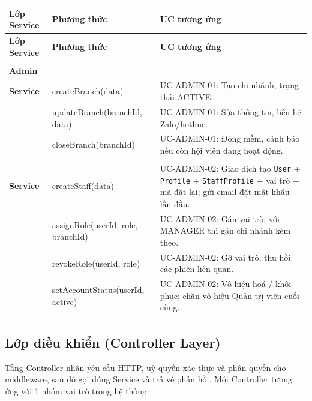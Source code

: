 \begingroup
\renewcommand{\arraystretch}{1.3}
\begin{longtable}{|>{\centering\arraybackslash}m{2.8cm}|>{\sloppy\small\ttfamily\raggedright\arraybackslash}p{7cm}|>{\raggedright\arraybackslash}m{4.5cm}|}
\hline
\textbf{Lớp Service} & \normalfont\normalsize\textbf{Phương thức} & \textbf{UC tương ứng} \\ \hline
\endfirsthead
\hline
\textbf{Lớp Service} & \normalfont\normalsize\textbf{Phương thức} & \textbf{UC tương ứng} \\ \hline
\endhead
\hline
\endfoot

\multirow{3}{*}{\makecell{\textbf{Branch}\\\textbf{Admin}\\\textbf{Service}}} &
  createBranch(data) &
  UC-ADMIN-01: Tạo chi nhánh, trạng thái ACTIVE. \\ \cline{2-3}
& updateBranch(branchId, data) &
  UC-ADMIN-01: Sửa thông tin, liên hệ Zalo/hotline. \\ \cline{2-3}
& closeBranch(branchId) &
  UC-ADMIN-01: Đóng mềm, cảnh báo nếu còn hội viên đang hoạt động. \\ \hline

\multirow{4}{*}{\makecell{\textbf{UserAdmin}\\\textbf{Service}}} &
  createStaff(data) &
  UC-ADMIN-02: Giao dịch tạo \texttt{User} + \texttt{Profile} + \texttt{StaffProfile}
  + vai trò + mã đặt lại; gửi email đặt mật khẩu lần đầu. \\ \cline{2-3}
& assignRole(userId, role, branchId) &
  UC-ADMIN-02: Gán vai trò; với MANAGER thì gán chi nhánh kèm theo. \\ \cline{2-3}
& revokeRole(userId, role) &
  UC-ADMIN-02: Gỡ vai trò, thu hồi các phiên liên quan. \\ \cline{2-3}
& setAccountStatus(userId, active) &
  UC-ADMIN-02: Vô hiệu hoá / khôi phục; chặn vô hiệu Quản trị viên cuối cùng. \\ \hline

\end{longtable}
\endgroup

\newpage
\subsection{Lớp điều khiển (Controller Layer)}

Tầng Controller nhận yêu cầu HTTP, uỷ quyền xác thực và phân quyền
cho middleware, sau đó gọi đúng Service và trả về phản hồi. Mỗi
Controller tương ứng với 1 nhóm vai trò trong hệ thống.

